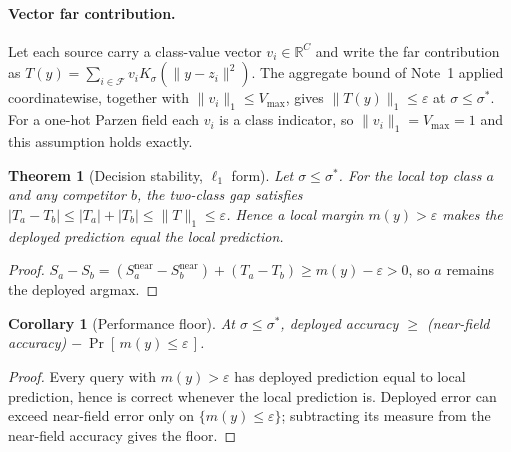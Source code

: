 \documentclass[10pt,twocolumn]{article}
\newtheorem{theorem}{Theorem}
\newtheorem{corollary}{Corollary}
\newcommand{\Ksig}{K_{\sigma}}
\newcommand{\sstar}{\sigma^{*}}
\newcommand{\Rbb}{\mathbb{R}}
\begin{document}
\paragraph{Vector far contribution.} Let each source carry a class-value vector $v_i\in\Rbb^C$ and write the far contribution as $T(y)=\sum_{i\in\mathcal{F}}v_i\Ksig(\lVert y-z_i\rVert^2)$. The aggregate bound of Note~1 applied coordinatewise, together with $\lVert v_i\rVert_1\le V_{\max}$, gives $\lVert T(y)\rVert_1\le\varepsilon$ at $\sigma\le\sstar$. For a one-hot Parzen field each $v_i$ is a class indicator, so $\lVert v_i\rVert_1=V_{\max}=1$ and this assumption holds exactly.
\begin{theorem}[Decision stability, $\ell_1$ form]
Let $\sigma\le\sstar$. For the local top class $a$ and any competitor $b$, the two-class gap satisfies $|T_a-T_b|\le|T_a|+|T_b|\le\lVert T\rVert_1\le\varepsilon$. Hence a local margin $m(y)>\varepsilon$ makes the deployed prediction equal the local prediction.
\end{theorem}
\begin{proof}
$S_a-S_b=(S_a^{\mathrm{near}}-S_b^{\mathrm{near}})+(T_a-T_b)\ge m(y)-\varepsilon>0$, so $a$ remains the deployed argmax.
\end{proof}

\begin{corollary}[Performance floor]
At $\sigma\le\sstar$, deployed accuracy $\ge$ (near-field accuracy) $-\ \Pr[\,m(y)\le \varepsilon\,]$.
\end{corollary}
\begin{proof}
Every query with $m(y)>\varepsilon$ has deployed prediction equal to local prediction, hence is correct whenever the local prediction is. Deployed error can exceed near-field error only on $\{m(y)\le\varepsilon\}$; subtracting its measure from the near-field accuracy gives the floor.
\end{proof}
\end{document}
